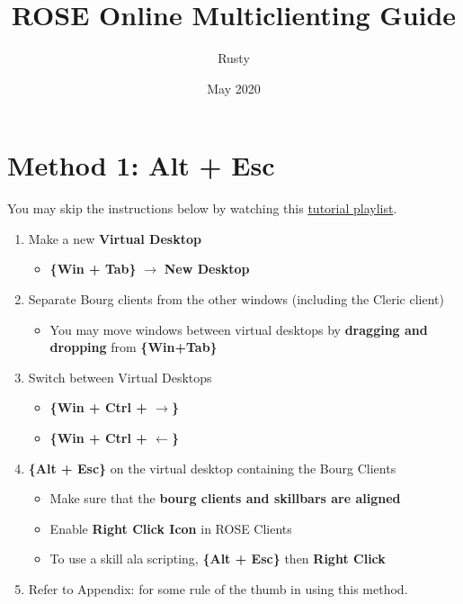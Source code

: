 \documentclass{article}
\title{ROSE Online Multiclienting Guide}
\author{Rusty}
\date{May 2020}
\begin{document}
\maketitle

\section{Method 1: Alt + Esc}
\label{section: method1}

You may skip the instructions below by watching this \href{https://www.youtube.com/watch?v=Loo_phNvK50&list=PLVUbtDqG7l80KYJ2zmCmPpPKnN2rwKMex}{tutorial playlist}.

\begin{enumerate}
   \item Make a new \textbf{Virtual Desktop}
   \begin{itemize}
     \item \textbf{\{Win + Tab\}} $\rightarrow$ \textbf{New Desktop}
   \end{itemize}
   \item Separate Bourg clients from the other windows (including the Cleric client)
   \begin{itemize}
     \item You may move windows between virtual desktops by \textbf{dragging and dropping} from \textbf{\{Win+Tab\}}
   \end{itemize}
   \item Switch between Virtual Desktops
   \begin{itemize}
     \item \textbf{\{Win + Ctrl + $\rightarrow$\}}
     \item \textbf{\{Win + Ctrl + $\leftarrow$\}}
   \end{itemize}
   \item \textbf{\{Alt + Esc\}} on the virtual desktop containing the Bourg Clients
   \begin{itemize}
     \item Make sure that the \textbf{bourg clients and skillbars are aligned}
     \item Enable \textbf{Right Click Icon} in ROSE Clients
     \item To use a skill ala scripting, \textbf{\{Alt + Esc\}} then \textbf{Right Click }
   \end{itemize}
   \item Refer to Appendix:  for some rule of the thumb in using this method.
 
\end{enumerate}
\end{document}
